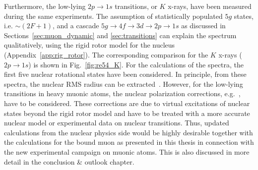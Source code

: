 %
%
%
Furthermore, the low-lying $2p\rightarrow1s$ transitions, or $K$ x-rays, have been measured during the same experiments. The assumption of statistically populated $5g$ states, i.e. $\sim (2F+1)$, and a cascade $5g\rightarrow 4f \rightarrow 3d \rightarrow 2p \rightarrow 1s$ as discussed in Sections~\ref{sec:muon_dynamic} and \ref{sec:transitions} can explain the spectrum qualitatively, using the rigid rotor model for the nucleus (Appendix~\ref{app:rig_rotor}). The corresponding comparison for the $K$ x-rays ($2p\rightarrow 1s$) is shown in Fig.~\ref{fig:re54_K}. For the calculations of the spectra, the first five nuclear rotational states have been considered. In principle, from these spectra, the nuclear RMS radius can be extracted~\cite{hitlin1970}. However, for the low-lying transitions in heavy muonic atoms, the nuclear polarization corrections, e.g.~\cite{chen1970}, have to be considered. These corrections are due to virtual excitations of nuclear states beyond the rigid rotor model and have to be treated with a more accurate nuclear model or experimental data on nuclear transitions. Thus, updated calculations from the nuclear physics side would be highly desirable together with the calculations for the bound muon as presented in this thesis in connection with the new experimental campaign on muonic atoms. 
This is also discussed in more detail in the conclusion \& outlook chapter.
